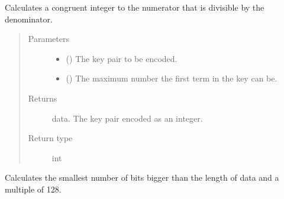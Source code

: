 \documentclass[letterpaper,10pt,english]{sphinxmanual}
\begin{document}
\begin{fulllineitems}
\label{\detokenize{index:Toolkit.key_to_data}}
Calculates a congruent integer to the numerator that is divisible by the denominator.
\begin{quote}\begin{description}
\item[{Parameters}] \leavevmode\begin{itemize}
\item {} 
 (\sphinxstyleliteralemphasis{, }) \textendash{} The key pair to be encoded.

\item {} 
 () \textendash{} The maximum number the first term in the key can be.

\end{itemize}

\item[{Returns}] \leavevmode
data. The key pair encoded as an integer.

\item[{Return type}] \leavevmode
int

\end{description}\end{quote}

\end{fulllineitems}


\begin{fulllineitems}
\label{\detokenize{index:Toolkit.next_multiple_of_128}}
Calculates the smallest number of bits bigger than the length of data and a multiple of 128.

\end{fulllineitems}

\end{document}
